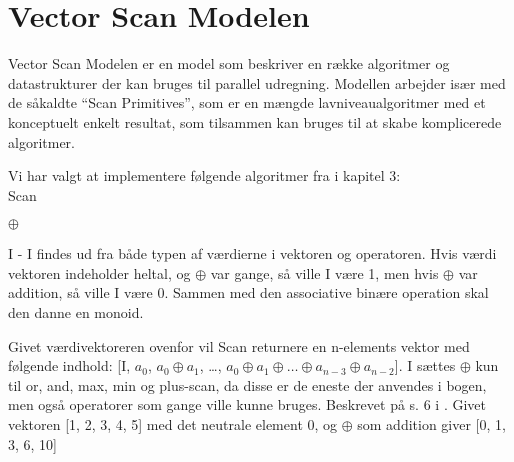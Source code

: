 

\section{Vector Scan Modelen}
\label{VectorScan}
Vector Scan Modelen er en model som beskriver en række algoritmer og datastrukturer der kan bruges til parallel udregning. Modellen arbejder især med de såkaldte ``Scan Primitives'', som er en mængde lavniveaualgoritmer med et konceptuelt enkelt resultat, som tilsammen kan bruges til at skabe komplicerede algoritmer.

Vi har valgt at implementere følgende algoritmer fra \cite{ble} i kapitel 3:\\
\label{ScanPrim}
\modelDesc
{Scan}
{
\item[Værdi vektor:][$a_0$, $a_1$, \ldots , $a_{n-2}$, $a_{n-1}$]
\item[Associativ binær operator:] $\oplus$
\item[Neutralt element:] I - I findes ud fra både typen af værdierne i vektoren og operatoren. Hvis værdi vektoren indeholder heltal, og $\oplus$ var gange, så ville I være 1, men hvis $\oplus$ var addition, så ville I være 0.
Sammen med den associative binære operation skal den danne en monoid.
}
{
Givet værdivektoreren ovenfor vil Scan returnere en n-elements vektor med følgende indhold: [I, $a_0$, $a_0 \oplus a_1$, \ldots , $a_0 \oplus a_1 \oplus \ldots \oplus a_{n-3} \oplus a_{n - 2}$]. I \cite{ble} sættes $\oplus$ kun til or, and, max, min og plus-scan, da disse er de eneste der anvendes i bogen, men også operatorer som gange ville kunne bruges. Beskrevet på s. 6 i \cite{ble}.
}
{
Givet vektoren [1, 2, 3, 4, 5] med det neutrale element 0, og $\oplus$ som addition giver [0, 1, 3, 6, 10]
}

